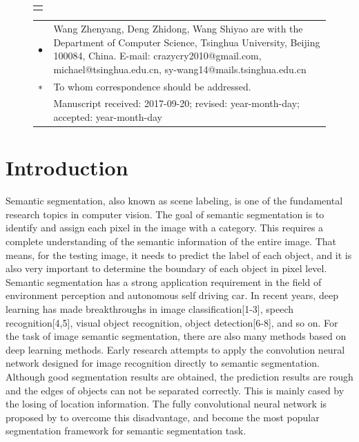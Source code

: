 \documentclass[10.5pt,compsoc]{TsT}
\theoremstyle{mystyle}
\begin{document}
{\begin{strip}
{\begin{tabular}{p{160mm}}
\end{tabular}
}
\vskip 6mm

\vskip -3mm
\end{strip}


\thispagestyle{plain}%
\thispagestyle{empty}%
\makeatother
\pagestyle{tstheadings}

\begin{figure}[b]
\vskip -6mm
\begin{tabular}{p{44mm}}
\toprule\\
\end{tabular}
\vskip -4.5mm
\noindent
\setlength{\tabcolsep}{1pt}
\begin{tabular}{p{1.5mm}p{79.5mm}}
$\bullet$& Wang Zhenyang, Deng Zhidong, Wang Shiyao are with the Department of Computer Science, Tsinghua University, Beijing 100084, China. E-mail: crazycry2010@gmail.com, michael@tsinghua.edu.cn, sy-wang14@mails.tsinghua.edu.cn \\
$\sf{*}$&
To whom correspondence should be addressed. \\
          &          Manuscript received: 2017-09-20; revised: year-month-day; accepted: year-month-day

\end{tabular}
\end{figure}



\section{Introduction}
\label{s:introduction}
\noindent

Semantic segmentation, also known as scene labeling, is one of the fundamental research topics in computer vision. The goal of semantic segmentation is to identify and assign each pixel in the image with a category. This requires a complete understanding of the semantic information of the entire image. That means, for the testing image, it needs to predict the label of each object, and it is also very important to determine the boundary of each object in pixel level. 
Semantic segmentation has a strong application requirement in the field of environment perception and autonomous self driving car. In recent years, deep learning has made breakthroughs in image classification[1-3], speech recognition[4,5], visual object recognition, object detection[6-8], and so on. For the task of image semantic segmentation, there are also many methods based on deep learning methods.
Early research attempts to apply the convolution neural network designed for image recognition directly to semantic segmentation.
Although good segmentation results are obtained, the prediction results are rough and the edges of objects  can not be separated correctly. This is mainly cased by the losing of location information. The fully convolutional neural network is proposed by to overcome this disadvantage, and become the most popular segmentation framework for semantic segmentation task.


}
\end{document}
